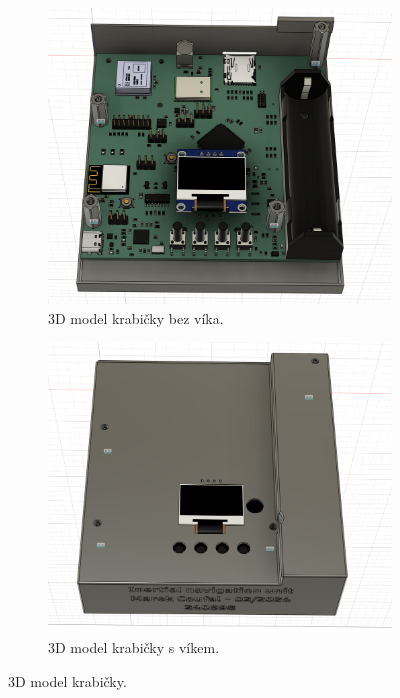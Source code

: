 \begin{figure}
     \centering
     \begin{subfigure}[b]{0.45\textwidth}
         \centering
         \includegraphics[width=\textwidth]{obrazky/boxNoLid}
         \caption{3D model krabičky bez víka.}
       
     \end{subfigure}
     \hfill
     \begin{subfigure}[b]{0.45\textwidth}
         \centering
         \includegraphics[width=\textwidth]{obrazky/boxWithLid}
         \caption{3D model krabičky s víkem.}
         
     \end{subfigure}
        \caption{3D model krabičky.}
        \label{fig:boxModel}
\end{figure}

